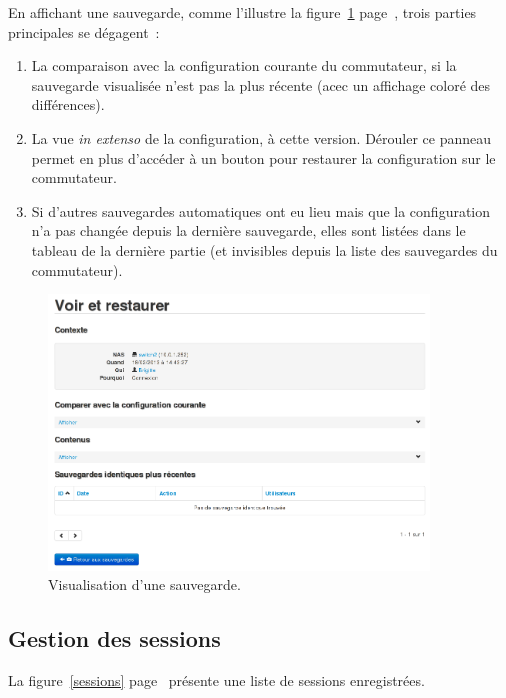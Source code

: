 En affichant une sauvegarde, comme l'illustre la figure~\ref{backupsview} page~\pageref{backupsview}, trois parties principales se dégagent~:

\begin{enumerate}
\item La comparaison avec la configuration courante du commutateur, si la sauvegarde visualisée n'est pas la plus récente (acec un affichage coloré des différences).
\item La vue \emph{in extenso} de la configuration, à cette version. Dérouler ce panneau permet en plus d'accéder à un bouton pour restaurer la configuration sur le commutateur.
\item Si d'autres sauvegardes automatiques ont eu lieu mais que la configuration n'a pas changée depuis la dernière sauvegarde, elles sont listées dans le tableau de la dernière partie (et invisibles depuis la liste des sauvegardes du commutateur).
\end{enumerate}

\begin{figure}[!h]
	\begin{center}
	    \includegraphics[width=0.9\textwidth]{img/backupsview.png}
	\end{center}
	\caption{Visualisation d'une sauvegarde.}
	\label{backupsview}
\end{figure}

\subsection{Gestion des sessions}

La figure~\ref{sessions} page~\pageref{sessions} présente une liste de sessions enregistrées.

